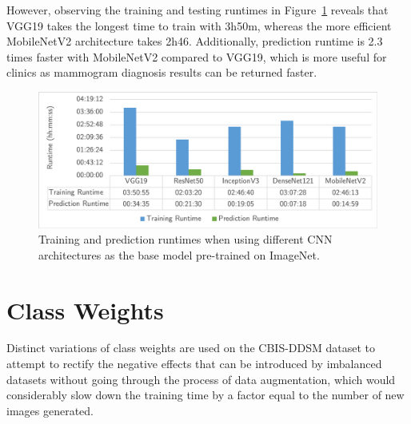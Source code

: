 

However, observing the training and testing runtimes in Figure~\ref{fig:evaluation-CNN_models_experiment-runtimes} reveals that VGG19 takes the longest time to train with 3h50m, whereas the more efficient MobileNetV2 architecture takes 2h46. Additionally, prediction runtime is 2.3 times faster with MobileNetV2 compared to VGG19, which is more useful for clinics as mammogram diagnosis results can be returned faster.

\begin{figure}[h]
\centerline{\includegraphics[width=\textwidth]{figures/evaluation/CNN_models_experiment/runtimes.png}}
\caption{\label{fig:evaluation-CNN_models_experiment-runtimes}Training and prediction runtimes when using different CNN architectures as the base model pre-trained on ImageNet.}
\end{figure}


\section{Class Weights}

Distinct variations of class weights are used on the CBIS-DDSM dataset to attempt to rectify the negative effects that can be introduced by imbalanced datasets without going through the process of data augmentation, which would considerably slow down the training time by a factor equal to the number of new images generated.\\

